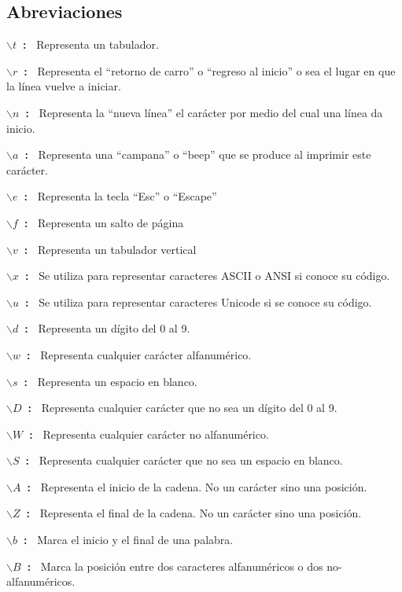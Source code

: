 \subsection{Abreviaciones}
\begin{description}
	\item \textbf{$\backslash t$\ :\ } Representa un tabulador.
	\item \textbf{$\backslash r$\ :\ } Representa el ``retorno de carro'' o ``regreso al inicio'' o sea el lugar en que la línea vuelve a iniciar.
	\item \textbf{$\backslash n$\ :\ } Representa la ``nueva línea'' el carácter por medio del cual una línea da inicio.
    	\item \textbf{$\backslash a$\ :\ } Representa una ``campana'' o ``beep'' que se produce al imprimir este carácter.
    	\item \textbf{$\backslash e$\ :\ } Representa la tecla ``Esc'' o ``Escape''
    	\item \textbf{$\backslash f$\ :\ } Representa un salto de página
    	\item \textbf{$\backslash v$\ :\ } Representa un tabulador vertical
    	\item \textbf{$\backslash x$\ :\ } Se utiliza para representar caracteres ASCII o ANSI si conoce su código.
    	\item \textbf{$\backslash u$\ :\ } Se utiliza para representar caracteres Unicode si se conoce su código.
    	\item \textbf{$\backslash d$\ :\ } Representa un dígito del 0 al 9.
    	\item \textbf{$\backslash w$\ :\ } Representa cualquier carácter alfanumérico.
    	\item \textbf{$\backslash s$\ :\ } Representa un espacio en blanco.
    	\item \textbf{$\backslash D$\ :\ } Representa cualquier carácter que no sea un dígito del 0 al 9.
    	\item \textbf{$\backslash W$\ :\ } Representa cualquier carácter no alfanumérico.
    	\item \textbf{$\backslash S$\ :\ } Representa cualquier carácter que no sea un espacio en blanco.
    	\item \textbf{$\backslash A$\ :\ } Representa el inicio de la cadena. No un carácter sino una posición.
    	\item \textbf{$\backslash Z$\ :\ } Representa el final de la cadena. No un carácter sino una posición.
    	\item \textbf{$\backslash b$\ :\ } Marca el inicio y el final de una palabra.
    	\item \textbf{$\backslash B$\ :\ } Marca la posición entre dos caracteres alfanuméricos o dos no-alfanuméricos.
\end{description}


